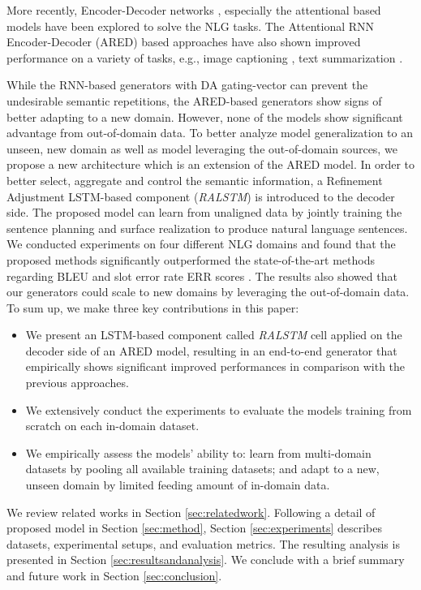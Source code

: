 \documentclass[11pt,a4paper]{article}
\begin{document}
More recently, Encoder-Decoder networks \cite{vinyals2015neural,li2015diversity}, especially the attentional based models \cite{wentoward,mei2015talk} have been explored to solve the NLG tasks. The Attentional RNN Encoder-Decoder \cite{bahdanau2014neural} (ARED) based approaches have also shown improved performance on a variety of tasks, e.g., image captioning \cite{xu2015show,yang2016review}, text summarization \cite{rush2015neural,nallapati2016abstractive}.



While the RNN-based generators with DA gating-vector can prevent the undesirable semantic repetitions, the ARED-based generators show signs of better adapting to a new domain. However, none of the models show significant advantage from out-of-domain data. To better analyze model generalization to an unseen, new domain as well as model leveraging the out-of-domain sources, we propose a new architecture which is an extension of the ARED model. 
In order to better select, aggregate and control the semantic information, a Refinement Adjustment LSTM-based component (\textit{RALSTM}) is introduced to the decoder side. The proposed model can learn from unaligned data by jointly training the sentence planning and surface realization to produce natural language sentences. We conducted experiments on four different NLG domains and found that the proposed methods significantly outperformed the state-of-the-art methods regarding BLEU \cite{papineni2002bleu} and slot error rate ERR scores \cite{wensclstm15}. The results also showed that our generators could scale to new domains by leveraging the out-of-domain data. To sum up, we make three key contributions in this paper:
\begin{itemize}
\item We present an LSTM-based component called \textit{RALSTM} cell applied on the decoder side of an ARED model, resulting in an end-to-end generator that empirically shows significant improved performances in comparison with the previous approaches.
\item We extensively conduct the experiments to evaluate the models training from scratch on each in-domain dataset.
\item We empirically assess the models' ability to: learn from multi-domain datasets by pooling all available training datasets; and adapt to a new, unseen domain by limited feeding amount of in-domain data.
\end{itemize}
We review related works in Section \ref{sec:relatedwork}. Following a detail of proposed model in Section \ref{sec:method}, Section \ref{sec:experiments} describes datasets, experimental setups, and evaluation metrics. The resulting analysis is presented in Section \ref{sec:resultsandanalysis}. We conclude with a brief summary and future work in Section \ref{sec:conclusion}.
\end{document}
